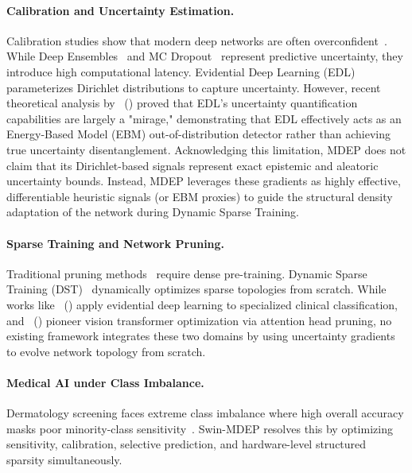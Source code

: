 \documentclass[letterpaper]{article} %
\begin{document}
\paragraph{Calibration and Uncertainty Estimation.} Calibration studies show that modern deep networks are often overconfident~\cite{guo2017calibration, minderer2021revisiting}. While Deep Ensembles~\cite{lakshminarayanan2017simple} and MC Dropout~\cite{gal2016dropout} represent predictive uncertainty, they introduce high computational latency. Evidential Deep Learning (EDL)~\cite{sensoy2018evidential} parameterizes Dirichlet distributions to capture uncertainty. However, recent theoretical analysis by \citeauthor{shen2024mirage}~(\citeyear{shen2024mirage}) proved that EDL's uncertainty quantification capabilities are largely a "mirage," demonstrating that EDL effectively acts as an Energy-Based Model (EBM) out-of-distribution detector rather than achieving true uncertainty disentanglement. Acknowledging this limitation, MDEP does not claim that its Dirichlet-based signals represent exact epistemic and aleatoric uncertainty bounds. Instead, MDEP leverages these gradients as highly effective, differentiable heuristic signals (or EBM proxies) to guide the structural density adaptation of the network during Dynamic Sparse Training.

\paragraph{Sparse Training and Network Pruning.} Traditional pruning methods~\cite{han2016deep, frankle2019lottery} require dense pre-training. Dynamic Sparse Training (DST)~\cite{mocanu2018scalable, evci2020rigging} dynamically optimizes sparse topologies from scratch. While works like \citeauthor{zhou2023domain}~(\citeyear{zhou2023domain}) apply evidential deep learning to specialized clinical classification, and \citeauthor{gabetni2026ensembling}~(\citeyear{gabetni2026ensembling}) pioneer vision transformer optimization via attention head pruning, no existing framework integrates these two domains by using uncertainty gradients to evolve network topology from scratch.

\paragraph{Medical AI under Class Imbalance.} Dermatology screening faces extreme class imbalance where high overall accuracy masks poor minority-class sensitivity~\cite{esteva2017dermatologist, johnson2019survey}. Swin-MDEP resolves this by optimizing sensitivity, calibration, selective prediction, and hardware-level structured sparsity simultaneously.
\end{document}
